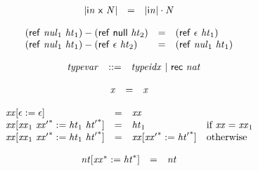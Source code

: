 $$
\begin{array}{@{}lcl@{}l@{}}
{|{\mathsf{i}}{{\mathit{n}}}~\mathsf{x}~{\mathit{N}}|} &=& {|{\mathsf{i}}{{\mathit{n}}}|} \cdot {\mathit{N}} &  \\
\end{array}
$$

\vspace{1ex}

$$
\begin{array}{@{}lcl@{}l@{}}
(\mathsf{ref}~{\mathit{nul}}_{{1}}~{\mathit{ht}}_{{1}}) - (\mathsf{ref}~\mathsf{null}~{\mathit{ht}}_{{2}}) &=& (\mathsf{ref}~\epsilon~{\mathit{ht}}_{{1}}) &  \\
(\mathsf{ref}~{\mathit{nul}}_{{1}}~{\mathit{ht}}_{{1}}) - (\mathsf{ref}~\epsilon~{\mathit{ht}}_{{2}}) &=& (\mathsf{ref}~{\mathit{nul}}_{{1}}~{\mathit{ht}}_{{1}}) &  \\
\end{array}
$$

\vspace{1ex}

$$
\begin{array}{@{}lrrl@{}l@{}}
& {\mathit{typevar}} &::=& {\mathit{typeidx}} ~|~ \mathsf{rec}~{\mathit{nat}} \\
\end{array}
$$

$$
\begin{array}{@{}lcl@{}l@{}}
{\mathit{x}} &=& {\mathit{x}} &  \\
\end{array}
$$

\vspace{1ex}

\vspace{1ex}

$$
\begin{array}{@{}lcl@{}l@{}}
{{\mathit{xx}}}{{}[\epsilon := \epsilon]} &=& {\mathit{xx}} &  \\
{{\mathit{xx}}}{{}[{\mathit{xx}}_{{1}}~{{\mathit{xx}'}^\ast} := {\mathit{ht}}_{{1}}~{{\mathit{ht}'}^\ast}]} &=& {\mathit{ht}}_{{1}} &\quad
  \mbox{if}~{\mathit{xx}} = {\mathit{xx}}_{{1}} \\
{{\mathit{xx}}}{{}[{\mathit{xx}}_{{1}}~{{\mathit{xx}'}^\ast} := {\mathit{ht}}_{{1}}~{{\mathit{ht}'}^\ast}]} &=& {{\mathit{xx}}}{{}[{{\mathit{xx}'}^\ast} := {{\mathit{ht}'}^\ast}]} &\quad
  \mbox{otherwise} \\
\end{array}
$$

$$
\begin{array}{@{}lcl@{}l@{}}
{{\mathit{nt}}}{{}[{{\mathit{xx}}^\ast} := {{\mathit{ht}}^\ast}]} &=& {\mathit{nt}} &  \\
\end{array}
$$

